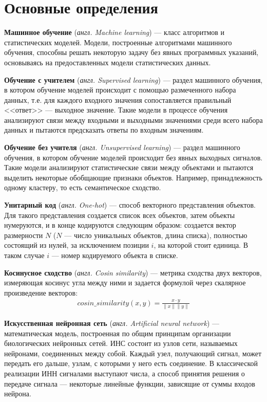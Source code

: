 \documentclass[times,specification,annotation]{itmo-student-thesis}
\begin{document}
\section{Основные определения}\label{sec:def}

\textbf{Машинное обучение} (\textit{англ. Machine learning}) --- класс алгоритмов и статистических моделей. Модели, построенные алгоритмами машинного обучения, способны решать некоторую задачу без явных программных указаний, основываясь на предоставленных модели статистических данных.   

\textbf{Обучение с учителем} (\textit{англ. Supervised learning}) --- раздел машинного обучения, в котором обучение моделей происходит с помощью размеченного набора данных, т.е. для каждого входного значения сопоставляется правильный <<ответ>> --- выходное значение. Такие модели в процессе обучения анализируют связи между входными и выходными значениями среди всего набора данных и пытаются предсказать ответы по входным значениям. 

\textbf{Обучение без учителя} (\textit{англ. Unsupervised learning}) --- раздел машинного обучения, в котором обучение моделей происходит без явных выходных сигналов. Такие модели анализируют статистические связи между объектами и пытаются выделить некоторые обобщающие признаки объектов. Например, принадлежность одному кластеру, то есть семантическое сходство.

\textbf{Унитарный код} (\textit{англ. One-hot}) --- способ векторного представления объектов. Для такого представления создается список всех объектов, затем объекты нумеруются, и в конце кодируются следующим образом: создается вектор размерности $N$ ($N$ --- число уникальных объектов, длина списка), полностью состоящий из нулей, за исключением позиции $i$, на которой стоит единица. В таком случае $i$ --- номер кодируемого объекта в списке. 

\textbf{Косинусное сходство} (\textit{англ. Cosin similarity}) --- метрика сходства двух векторов, измеряющая косинус угла между ними и задается формулой через скалярное произведение векторов:
 \begin{align*}
 cosin\_similarity(x, y) = \frac{x \cdot y}{\lVert x \rVert \lVert y \rVert} 
 \end{align*}
 
\textbf{Искусственная нейронная сеть} (\textit{англ. Artificial neural network}) --- математическая модель, построенная по общим принципам организации биологических нейронных сетей. ИНС состоит из узлов сети, называемых нейронами, соединенных между собой. Каждый узел, получающий сигнал, может передать его дальше, узлам, с которыми у него есть соединение. В классической реализации ИНН сигналами выступают числа, а способ принятия решения о передаче сигнала --- некоторые линейные функции, зависящие от суммы входов нейрона.  
 
\end{document}
